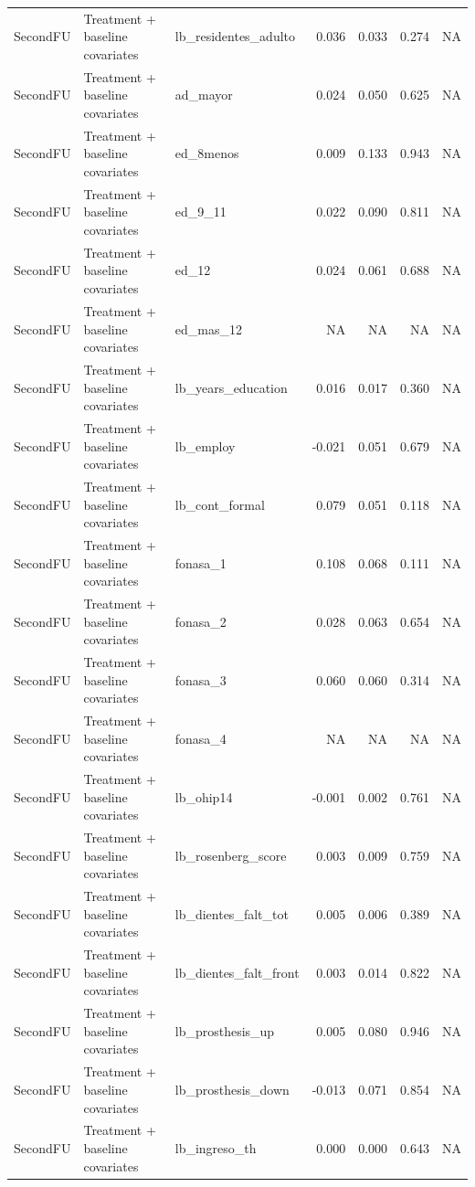 \begin{table}
\begin{tabular}[t]{lllrrrr}
SecondFU & Treatment + baseline covariates & lb\_residentes\_adulto & 0.036 & 0.033 & 0.274 & NA\\
SecondFU & Treatment + baseline covariates & ad\_mayor & 0.024 & 0.050 & 0.625 & NA\\
\addlinespace
SecondFU & Treatment + baseline covariates & ed\_8menos & 0.009 & 0.133 & 0.943 & NA\\
SecondFU & Treatment + baseline covariates & ed\_9\_11 & 0.022 & 0.090 & 0.811 & NA\\
SecondFU & Treatment + baseline covariates & ed\_12 & 0.024 & 0.061 & 0.688 & NA\\
SecondFU & Treatment + baseline covariates & ed\_mas\_12 & NA & NA & NA & NA\\
SecondFU & Treatment + baseline covariates & lb\_years\_education & 0.016 & 0.017 & 0.360 & NA\\
\addlinespace
SecondFU & Treatment + baseline covariates & lb\_employ & -0.021 & 0.051 & 0.679 & NA\\
SecondFU & Treatment + baseline covariates & lb\_cont\_formal & 0.079 & 0.051 & 0.118 & NA\\
SecondFU & Treatment + baseline covariates & fonasa\_1 & 0.108 & 0.068 & 0.111 & NA\\
SecondFU & Treatment + baseline covariates & fonasa\_2 & 0.028 & 0.063 & 0.654 & NA\\
SecondFU & Treatment + baseline covariates & fonasa\_3 & 0.060 & 0.060 & 0.314 & NA\\
\addlinespace
SecondFU & Treatment + baseline covariates & fonasa\_4 & NA & NA & NA & NA\\
SecondFU & Treatment + baseline covariates & lb\_ohip14 & -0.001 & 0.002 & 0.761 & NA\\
SecondFU & Treatment + baseline covariates & lb\_rosenberg\_score & 0.003 & 0.009 & 0.759 & NA\\
SecondFU & Treatment + baseline covariates & lb\_dientes\_falt\_tot & 0.005 & 0.006 & 0.389 & NA\\
SecondFU & Treatment + baseline covariates & lb\_dientes\_falt\_front & 0.003 & 0.014 & 0.822 & NA\\
\addlinespace
SecondFU & Treatment + baseline covariates & lb\_prosthesis\_up & 0.005 & 0.080 & 0.946 & NA\\
SecondFU & Treatment + baseline covariates & lb\_prosthesis\_down & -0.013 & 0.071 & 0.854 & NA\\
SecondFU & Treatment + baseline covariates & lb\_ingreso\_th & 0.000 & 0.000 & 0.643 & NA\\
\bottomrule
\end{tabular}
\end{table}
